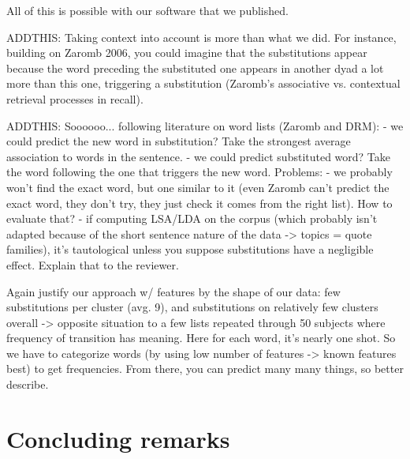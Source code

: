 \begin{new}
All of this is possible with our software that we published.

ADDTHIS:
Taking context into account is more than what we did. For instance, building on Zaromb 2006, you could imagine that the substitutions appear because the word preceding the substituted one appears in another dyad a lot more than this one, triggering a substitution (Zaromb's associative vs. contextual retrieval processes in recall).

ADDTHIS:
Soooooo... following literature on word lists (Zaromb and DRM):
- we could predict the new word in substitution? Take the strongest average association to words in the sentence.
- we could predict substituted word? Take the word following the one that triggers the new word.
Problems:
- we probably won't find the exact word, but one similar to it (even Zaromb can't predict the exact word, they don't try, they just check it comes from the right list). How to evaluate that?
- if computing LSA/LDA on the corpus (which probably isn't adapted because of the short sentence nature of the data -> topics = quote families), it's tautological unless you suppose substitutions have a negligible effect.
Explain that to the reviewer.

Again justify our approach w/ features by the shape of our data: few substitutions per cluster (avg. 9), and substitutions on relatively few clusters overall -> opposite situation to a few lists repeated through 50 subjects where frequency of transition has meaning. Here for each word, it's nearly one shot. So we have to categorize words (by using low number of features -> known features best) to get frequencies. From there, you can predict many many things, so better describe.


\end{new}

\section{Concluding remarks}\label{sec:conclusion}


